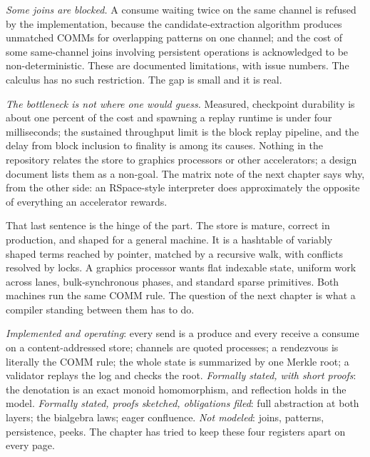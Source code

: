 \emph{Some joins are blocked.} A consume waiting twice on the same channel is refused by the
implementation, because the candidate-extraction algorithm produces unmatched COMMs for
overlapping patterns on one channel; and the cost of some same-channel joins involving
persistent operations is acknowledged to be non-deterministic. These are documented
limitations, with issue numbers. The calculus has no such restriction. The gap is small and
it is real.

\emph{The bottleneck is not where one would guess.} Measured, checkpoint durability is about
one percent of the cost and spawning a replay runtime is under four milliseconds; the
sustained throughput limit is the block replay pipeline, and the delay from block inclusion
to finality is among its causes. Nothing in the repository relates the store to graphics
processors or other accelerators; a design document lists them as a non-goal. The matrix
note of the next chapter says why, from the other side: an RSpace-style interpreter does
approximately the opposite of everything an accelerator rewards.

That last sentence is the hinge of the part. The store is mature, correct in production,
and shaped for a general machine. It is a hashtable of variably shaped terms reached by
pointer, matched by a recursive walk, with conflicts resolved by locks. A graphics
processor wants flat indexable state, uniform work across lanes, bulk-synchronous phases,
and standard sparse primitives. Both machines run the same COMM rule. The question of the
next chapter is what a compiler standing between them has to do.

\begin{remark}
\label{rs:rmk:claims}
\emph{Implemented and operating}: every send is a produce and every receive a consume on a
content-addressed store; channels are quoted processes; a rendezvous is literally the COMM
rule; the whole state is summarized by one Merkle root; a validator replays the log and
checks the root. \emph{Formally stated, with short proofs}: the denotation is an exact
monoid homomorphism, and reflection holds in the model. \emph{Formally stated, proofs
sketched, obligations filed}: full abstraction at both layers; the bialgebra laws; eager
confluence. \emph{Not modeled}: joins, patterns, persistence, peeks. The chapter has tried
to keep these four registers apart on every page.
\end{remark}

